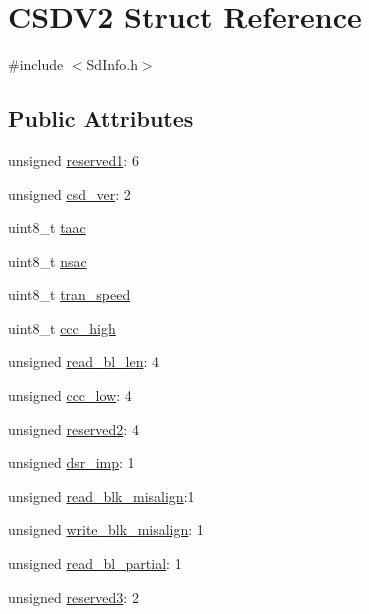 \hypertarget{struct_c_s_d_v2}{}\section{C\+S\+D\+V2 Struct Reference}
\label{struct_c_s_d_v2}


{\ttfamily \#include $<$Sd\+Info.\+h$>$}

\subsection*{Public Attributes}
\begin{DoxyCompactItemize}
\item 
unsigned \hyperlink{struct_c_s_d_v2_a7778a9786d45cd4efa7bf06d7bded52a}{reserved1}\+: 6
\item 
unsigned \hyperlink{struct_c_s_d_v2_a59dccb194acb31b218f94f2fbb81f92b}{csd\+\_\+ver}\+: 2
\item 
uint8\+\_\+t \hyperlink{struct_c_s_d_v2_a66975134ee179b2c2d93bf4ae3b522dd}{taac}
\item 
uint8\+\_\+t \hyperlink{struct_c_s_d_v2_a2fcdefca1df007ad0527d29af26c34ac}{nsac}
\item 
uint8\+\_\+t \hyperlink{struct_c_s_d_v2_a4321f8cba41dcefe65e4d8357b93a705}{tran\+\_\+speed}
\item 
uint8\+\_\+t \hyperlink{struct_c_s_d_v2_a577a7333925acccced97b25905f50c6e}{ccc\+\_\+high}
\item 
unsigned \hyperlink{struct_c_s_d_v2_a79cb233cef532dc1682e0ef11f7745dc}{read\+\_\+bl\+\_\+len}\+: 4
\item 
unsigned \hyperlink{struct_c_s_d_v2_ae40da77d4c0d6c911ebd868eceda8ea9}{ccc\+\_\+low}\+: 4
\item 
unsigned \hyperlink{struct_c_s_d_v2_a5151e2d94077d2a1ac8361174e4cd55a}{reserved2}\+: 4
\item 
unsigned \hyperlink{struct_c_s_d_v2_a125f8388263cb94ac83fea63e1e375f5}{dsr\+\_\+imp}\+: 1
\item 
unsigned \hyperlink{struct_c_s_d_v2_aa4b5351683ccc4331a446dccfa22ba97}{read\+\_\+blk\+\_\+misalign}\+:1
\item 
unsigned \hyperlink{struct_c_s_d_v2_a581efcca315ea376735dd9ca7f5172a8}{write\+\_\+blk\+\_\+misalign}\+: 1
\item 
unsigned \hyperlink{struct_c_s_d_v2_acb3ef2206ca2c6c5266c67b695509036}{read\+\_\+bl\+\_\+partial}\+: 1
\item 
unsigned \hyperlink{struct_c_s_d_v2_a75924bf9bb5d5789e504a7b2d0dafb52}{reserved3}\+: 2

\end{DoxyCompactItemize}
